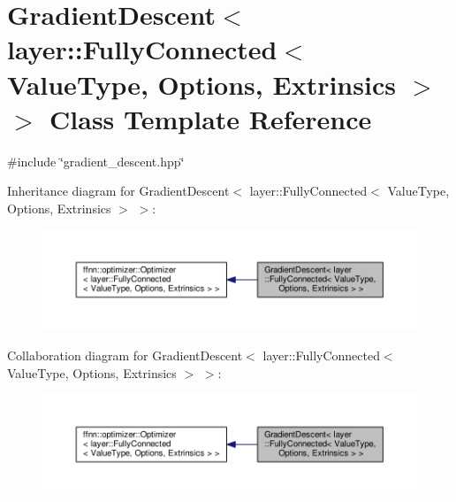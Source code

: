 \hypertarget{class_gradient_descent_3_01layer_1_1_fully_connected_3_01_value_type_00_01_options_00_01_extrinsics_01_4_01_4}{\section{Gradient\-Descent$<$ layer\-:\-:Fully\-Connected$<$ Value\-Type, Options, Extrinsics $>$ $>$ Class Template Reference}
\label{class_gradient_descent_3_01layer_1_1_fully_connected_3_01_value_type_00_01_options_00_01_extrinsics_01_4_01_4}
}


{\ttfamily \#include \char`\"{}gradient\-\_\-descent.\-hpp\char`\"{}}



Inheritance diagram for Gradient\-Descent$<$ layer\-:\-:Fully\-Connected$<$ Value\-Type, Options, Extrinsics $>$ $>$\-:
\nopagebreak
\begin{figure}[H]
\begin{center}
\leavevmode
\includegraphics[width=350pt]{class_gradient_descent_3_01layer_1_1_fully_connected_3_01_value_type_00_01_options_00_01_extrinsics_01_4_01_4__inherit__graph}
\end{center}
\end{figure}


Collaboration diagram for Gradient\-Descent$<$ layer\-:\-:Fully\-Connected$<$ Value\-Type, Options, Extrinsics $>$ $>$\-:
\nopagebreak
\begin{figure}[H]
\begin{center}
\leavevmode
\includegraphics[width=350pt]{class_gradient_descent_3_01layer_1_1_fully_connected_3_01_value_type_00_01_options_00_01_extrinsics_01_4_01_4__coll__graph}
\end{center}
\end{figure}
